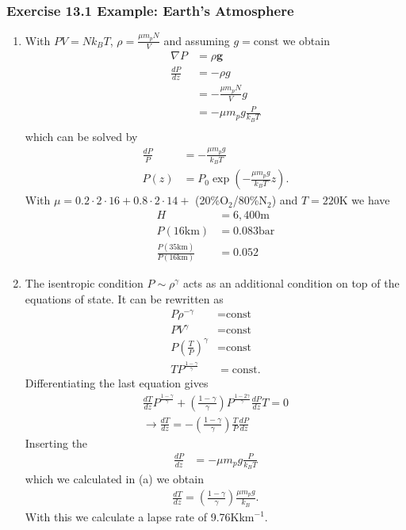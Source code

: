 \documentclass[10pt,a4paper]{article}
\theoremstyle{definition}
\begin{document}
\subsubsection{Exercise 13.1 Example: Earth's Atmosphere}
\begin{enumerate}[label=(\alph*)]
\item With $PV=Nk_BT$, $\rho=\frac{\mu m_p N}{V}$ and assuming $g=\text{const}$ we obtain
\begin{align}
    \nabla P&=\rho \mathbf{g}\\
    \frac{dP}{dz} &=-\rho g\\
    &=-\frac{\mu m_p N}{V} g\\
    &=-\mu m_p g\frac{P}{k_BT}\\
\end{align}
which can be solved by
\begin{align}
    \frac{dP}{P}&=-\frac{\mu m_p g}{k_BT}\\
    P(z)&=P_0\exp\left(-\frac{\mu m_p g}{k_B T}z\right).
\end{align}
With $\mu=0.2\cdot2\cdot16+0.8\cdot2\cdot14+$ (20\%O$_2$/80\%N$_2$) and $T=220$K we have
\begin{align}
    H&=6,400\text{m}\\
    P(16\text{km})&=0.083\text{bar}\\
    \frac{P(35\text{km})}{P(16\text{km})}&=0.052
\end{align}
\item The isentropic condition $P\sim\rho^\gamma$ acts as an additional condition on top of the equations of state. It can be rewritten as
\begin{align}
    P\rho^{-\gamma}&=\text{const}\\
    PV^{\gamma}&=\text{const}\\
    P\left(\frac{T}{P}\right)^{\gamma}&=\text{const}\\
    TP^\frac{1-\gamma}{\gamma}&=\text{const}.
\end{align}
Differentiating the last equation gives
\begin{align}
    \frac{dT}{dz}P^\frac{1-\gamma}{\gamma}+\left(\frac{1-\gamma}{\gamma}\right)P^{\frac{1-2\gamma}{\gamma}}\frac{dP}{dz}T=0\\
    \rightarrow\frac{dT}{dz}=-\left(\frac{1-\gamma}{\gamma}\right)\frac{T}{P}\frac{dP}{dz}
\end{align}
Inserting the
\begin{align}
    \frac{dP}{dz}&=-\mu m_p g\frac{P}{k_BT}
\end{align}
which we calculated in (a) we obtain
\begin{align}
    \frac{dT}{dz}=\left(\frac{1-\gamma}{\gamma}\right)\frac{\mu m_p g}{k_B}.
\end{align}
With this we calculate a lapse rate of 9.76K\;km$^{-1}$.
\end{enumerate}
\end{document}
